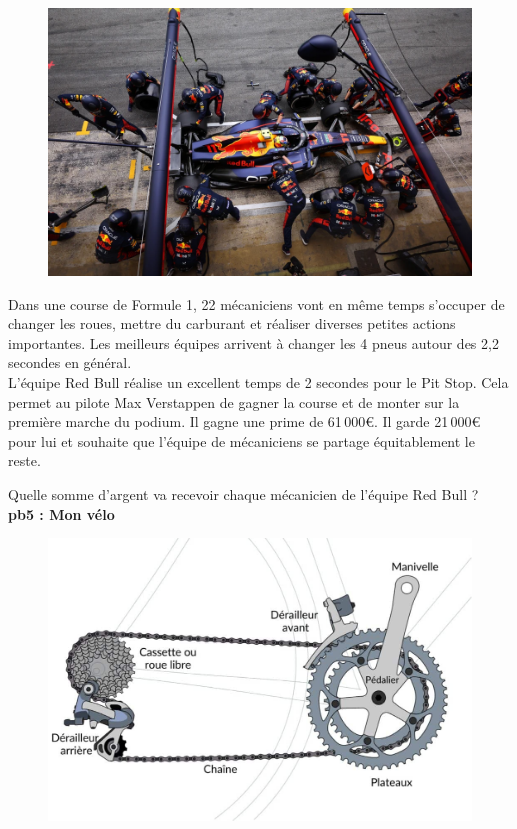 \begin{multicols}{2} 
  \begin{figure}[H]
    \centering
    \includegraphics[width=0.8\linewidth]{5x2-inegalite-triangulaire/f1.png}
  \end{figure}  \columnbreak

  Dans une course de Formule 1, 22 mécaniciens vont en même temps s'occuper de changer les roues, mettre du carburant et réaliser diverses petites actions importantes. Les meilleurs équipes arrivent à changer les 4 pneus autour des 2,2 secondes en général. \\

  L'équipe Red Bull réalise un excellent temps de 2 secondes pour le Pit Stop. Cela permet au pilote Max Verstappen de gagner la course et de monter sur la première marche du podium. Il gagne une prime de 61\,000€. Il garde 21\,000€ pour lui et souhaite que l'équipe de mécaniciens se partage équitablement le reste. \\
\end{multicols}

Quelle somme d'argent va recevoir chaque mécanicien de l'équipe Red Bull ?\\

\textbf{pb5 : Mon vélo} \\

\begin{figure}[H]
  \centering
  \includegraphics[width=0.4\linewidth]{5x2-inegalite-triangulaire/velo.jpg}
\end{figure} 

